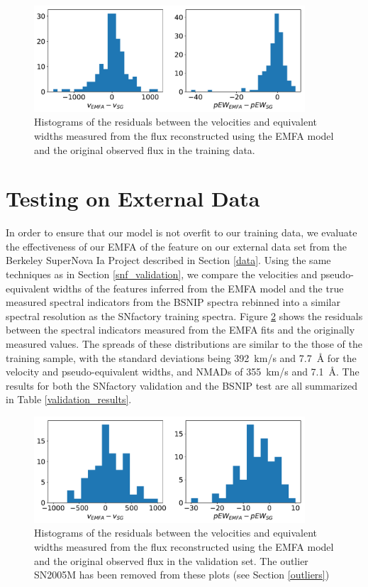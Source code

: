 \begin{figure}[htbp]
    \centering
    \includegraphics[width=0.9\textwidth]{figures/si_feat_pca/snf_recovery_resids.pdf}
    \caption{Histograms of the residuals between the velocities and equivalent widths measured from the flux reconstructed using the EMFA model and the original observed flux in the training data.}
    \label{snf_hist_resids_native_resolution}
\end{figure}

\section{Testing on External Data}
In order to ensure that our model is not overfit to our training data, we evaluate the effectiveness of our EMFA of the \siliconii{} feature on our external data set from the Berkeley SuperNova Ia Project \citep[BSNIP,][]{silverman_berkeley_2012} described in Section \ref{data}. Using the same techniques as in Section \ref{snf_validation}, we compare the velocities and pseudo-equivalent widths of the features inferred from the EMFA model and the true measured spectral indicators from the BSNIP spectra rebinned into a similar spectral resolution as the SNfactory training spectra. Figure \ref{bsnip_hist_resids} shows the residuals between the spectral indicators measured from the EMFA fits and the originally measured values. The spreads of these distributions are similar to the those of the training sample, with the standard deviations being 392~km/s and 7.7~\AA{} for the velocity and pseudo-equivalent widths, and NMADs of 355~km/s and 7.1~\AA{}. The results for both the SNfactory validation and the BSNIP test are all summarized in Table \ref{validation_results}.

\begin{figure}[htbp]
    \centering
    \includegraphics[width=0.9\textwidth]{figures/si_feat_pca/bsnip_recovery_resids.pdf}
    \caption{Histograms of the residuals between the velocities and equivalent widths measured from the flux reconstructed using the EMFA model and the original observed flux in the validation set. The outlier SN2005M has been removed from these plots (see Section \ref{outliers})}
    \label{bsnip_hist_resids}
\end{figure}

